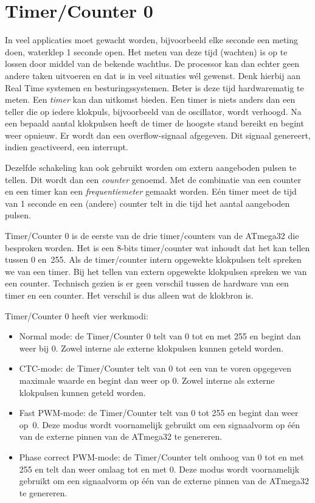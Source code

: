 \chapter{Timer/Counter 0}
\label{cha:timercounters}
In veel applicaties moet gewacht worden, bijvoorbeeld elke seconde een meting doen,
waterklep 1 seconde open. Het meten van deze tijd (wachten) is op te lossen door
middel van de bekende wachtlus. De processor kan dan echter geen andere taken
uitvoeren en dat is in veel situaties w\'el gewenst. Denk hierbij aan Real Time
systemen en besturingssystemen. Beter is deze tijd hardwarematig te meten.
Een \textsl{timer} kan dan uitkomst bieden. Een timer is niets anders dan een teller
die op iedere klokpuls, bijvoorbeeld van de oscillator, wordt verhoogd. Na een bepaald
aantal klokpulsen heeft de timer de hoogste stand bereikt en begint weer opnieuw.
Er wordt dan een overflow-signaal afgegeven. Dit signaal genereert, indien geactiveerd,
een interrupt.

Dezelfde schakeling kan ook gebruikt worden om extern aangeboden pulsen te tellen.
Dit wordt dan een \textsl{counter} genoemd. Met de combinatie van een counter en een
timer kan een \textsl{frequentiemeter} gemaakt worden. E\'en timer meet de tijd van 1
seconde en een (andere) counter telt in die tijd het aantal aangeboden pulsen.

Timer/Counter 0 is de eerste van de drie timer/counters van de ATmega32 die
besproken worden. Het is een 8-bits timer/counter wat inhoudt dat het kan tellen
tussen 0 en~255. Als de timer/counter intern opgewekte klokpulsen telt spreken
we van een timer. Bij het tellen van extern opgewekte klokpulsen spreken
we van een counter. Technisch gezien is er geen verschil tussen de hardware
van een timer en een counter. Het verschil is dus alleen wat de klokbron is.

Timer/Counter 0 heeft vier werkmodi:
\begin{itemize}
\item Normal mode: de Timer/Counter 0 telt van 0 tot en met 255 en begint dan
weer bij 0. Zowel interne ale externe klokpulsen kunnen geteld worden.
\item CTC-mode: de Timer/Counter telt van 0 tot een van te voren opgegeven
maximale waarde en begint dan weer op 0. Zowel interne als externe klokpulsen
kunnen geteld worden.
\item Fast PWM-mode: de Timer/Counter telt van 0 tot 255 en begint dan weer op~0.
Deze modus wordt voornamelijk gebruikt om een signaalvorm op \'e\'en van de externe
pinnen van de ATmega32 te genereren.
\item Phase correct PWM-mode: de Timer/Counter telt omhoog van 0 tot en met 255
en telt dan weer omlaag tot en met 0. Deze modus wordt voornamelijk gebruikt om een
signaalvorm op \'e\'en van de externe pinnen van de ATmega32 te genereren.
\end{itemize}

